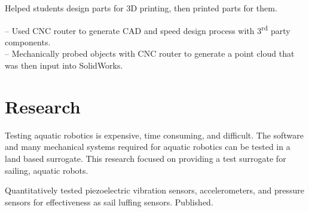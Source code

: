 \documentclass[]{deedy-resume-openfont}
\begin{document}
\begin{minipage}[t]{0.66\textwidth}
Helped students design parts for 3D printing, then printed parts for them.
\sectionsep


-- Used CNC router to generate CAD and speed design process with 3\textsuperscript{rd} party components.\\
-- Mechanically probed objects with CNC router to generate a point cloud that was then input into SolidWorks.
\sectionsep



\section{Research}
Testing aquatic robotics is expensive, time consuming, and difficult. The software and many mechanical systems required for aquatic robotics can be tested in a land based surrogate. This research focused on providing a test surrogate for sailing, aquatic robots.
\sectionsep

Quantitatively tested piezoelectric vibration sensors, accelerometers, and pressure sensors for effectiveness as sail luffing sensors. Published.
\sectionsep




\end{minipage}
\end{document}
